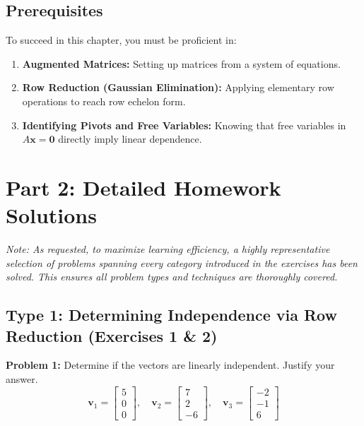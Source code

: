 \documentclass[11pt]{article}
\begin{document}
\subsection{Prerequisites}
To succeed in this chapter, you must be proficient in:
\begin{enumerate}
    \item \textbf{Augmented Matrices:} Setting up matrices from a system of equations.
    \item \textbf{Row Reduction (Gaussian Elimination):} Applying elementary row operations to reach row echelon form.
    \item \textbf{Identifying Pivots and Free Variables:} Knowing that free variables in $A\mathbf{x} = \mathbf{0}$ directly imply linear dependence.
\end{enumerate}

\newpage

\section{Part 2: Detailed Homework Solutions}

\textit{Note: As requested, to maximize learning efficiency, a highly representative selection of problems spanning every category introduced in the exercises has been solved. This ensures all problem types and techniques are thoroughly covered.}

\subsection{Type 1: Determining Independence via Row Reduction (Exercises 1 \& 2)}

\textbf{Problem 1:} Determine if the vectors are linearly independent. Justify your answer.
\[ \mathbf{v}_1 = \begin{bmatrix} 5 \\ 0 \\ 0 \end{bmatrix}, \quad \mathbf{v}_2 = \begin{bmatrix} 7 \\ 2 \\ -6 \end{bmatrix}, \quad \mathbf{v}_3 = \begin{bmatrix} -2 \\ -1 \\ 6 \end{bmatrix} \]
\end{document}
